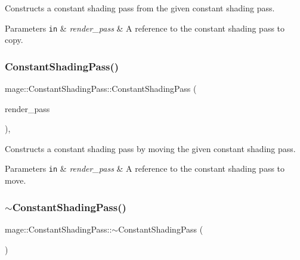 Constructs a constant shading pass from the given constant shading pass.


\begin{DoxyParams}[1]{Parameters}
\mbox{\tt in}  & {\em render\+\_\+pass} & A reference to the constant shading pass to copy. \\
\hline
\end{DoxyParams}
\hypertarget{classmage_1_1_constant_shading_pass_a67b6af1402885092fbcc1aa5d4cf4be5}{}\label{classmage_1_1_constant_shading_pass_a67b6af1402885092fbcc1aa5d4cf4be5} 
\subsubsection{\texorpdfstring{Constant\+Shading\+Pass()}{ConstantShadingPass()}\hspace{0.1cm}{\footnotesize\ttfamily [3/3]}}
{\footnotesize\ttfamily mage\+::\+Constant\+Shading\+Pass\+::\+Constant\+Shading\+Pass (\begin{DoxyParamCaption}\item[{\hyperlink{classmage_1_1_constant_shading_pass}{Constant\+Shading\+Pass} \&\&}]{render\+\_\+pass }\end{DoxyParamCaption})\hspace{0.3cm}{\ttfamily [default]}, {\ttfamily [noexcept]}}

Constructs a constant shading pass by moving the given constant shading pass.


\begin{DoxyParams}[1]{Parameters}
\mbox{\tt in}  & {\em render\+\_\+pass} & A reference to the constant shading pass to move. \\
\hline
\end{DoxyParams}
\hypertarget{classmage_1_1_constant_shading_pass_a2ef56dc45910519d5e0137b14768738e}{}\label{classmage_1_1_constant_shading_pass_a2ef56dc45910519d5e0137b14768738e} 
\subsubsection{\texorpdfstring{$\sim$\+Constant\+Shading\+Pass()}{~ConstantShadingPass()}}
{\footnotesize\ttfamily mage\+::\+Constant\+Shading\+Pass\+::$\sim$\+Constant\+Shading\+Pass (\begin{DoxyParamCaption}{ }\end{DoxyParamCaption})\hspace{0.3cm}{\ttfamily [default]}}


